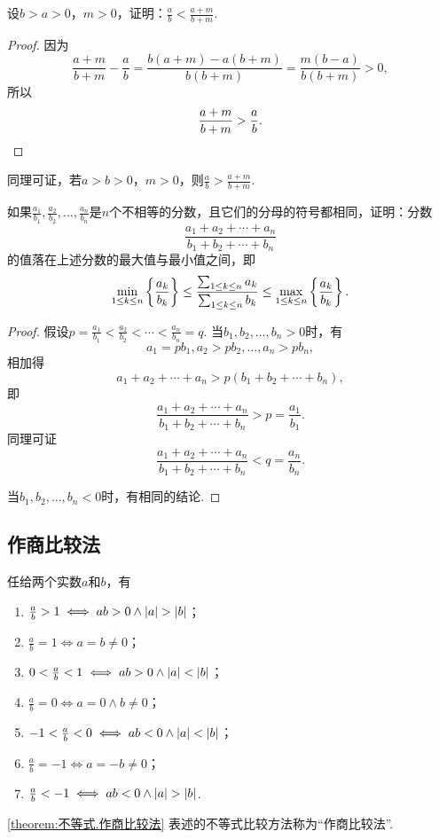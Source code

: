 \begin{example}\label{example:不等式.真分数的分子分母同加一个正数}
设\(b > a > 0\)，\(m > 0\)，证明：\(\frac{a}{b} < \frac{a+m}{b+m}\).
\begin{proof}
因为\[
\frac{a+m}{b+m} - \frac{a}{b}
= \frac{b(a+m) - a(b+m)}{b(b+m)}
= \frac{m(b-a)}{b(b+m)} > 0,
\]所以\[
\frac{a+m}{b+m} > \frac{a}{b}.
\qedhere
\]
\end{proof}
\end{example}
同理可证，若\(a > b > 0\)，\(m > 0\)，则\(\frac{a}{b} > \frac{a+m}{b+m}\).

\begin{example}\label{example:不等式.不同浓度的溶液的混合}
如果\(\frac{a_1}{b_1},\frac{a_2}{b_2},\dotsc,\frac{a_n}{b_n}\)是\(n\)个不相等的分数，且它们的分母的符号都相同，证明：分数\[
\frac{a_1+a_2+\dotsb+a_n}{b_1+b_2+\dotsb+b_n}
\]的值落在上述分数的最大值与最小值之间，即
\begin{equation}
\def\lu{_{1 \leq k \leq n}}%
\min\lu\left\{ \frac{a_k}{b_k} \right\}
\leq
\frac{\sum\lu a_k}{\sum\lu b_k}
\leq
\max\lu\left\{ \frac{a_k}{b_k} \right\}.
\end{equation}
\begin{proof}
假设\(p=\frac{a_1}{b_1}<\frac{a_2}{b_2}<\dotsb<\frac{a_n}{b_n}=q\).
当\(b_1,b_2,\dotsc,b_n>0\)时，有\[
a_1 = p b_1,
a_2 > p b_2,
\dotsc,
a_n > p b_n,
\]相加得\[
a_1 + a_2 + \dotsb + a_n > p(b_1 + b_2 + \dotsb + b_n),
\]即\[
\frac{a_1+a_2+\dotsb+a_n}{b_1+b_2+\dotsb+b_n} > p = \frac{a_1}{b_1}.
\]同理可证\[
\frac{a_1+a_2+\dotsb+a_n}{b_1+b_2+\dotsb+b_n} < q = \frac{a_n}{b_n}.
\]

当\(b_1,b_2,\dotsc,b_n<0\)时，有相同的结论.
\end{proof}
\end{example}

\subsection{作商比较法}
\begin{theorem}\label{theorem:不等式.作商比较法}
任给两个实数\(a\)和\(b\)，有\begin{enumerate}
\item \(\frac{a}{b} > 1 \iff ab > 0 \land \abs{a} > \abs{b}\)；
\item \(\frac{a}{b} = 1 \iff a = b \neq 0\)；
\item \(0 < \frac{a}{b} < 1 \iff ab > 0 \land \abs{a} < \abs{b}\)；
\item \(\frac{a}{b} = 0 \iff a = 0 \land b \neq 0\)；
\item \(-1 < \frac{a}{b} < 0 \iff ab < 0 \land \abs{a} < \abs{b}\)；
\item \(\frac{a}{b} = -1 \iff a = -b \neq 0\)；
\item \(\frac{a}{b} < -1 \iff ab < 0 \land \abs{a} > \abs{b}\).
\end{enumerate}
\end{theorem}
\cref{theorem:不等式.作商比较法} 表述的不等式比较方法称为“作商比较法”.

